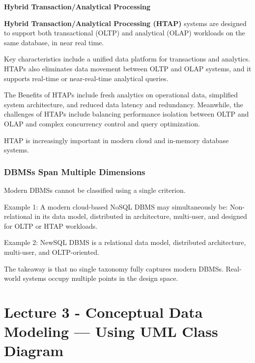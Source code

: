 \documentclass[11pt]{article}
\newenvironment{aside}
  {\begin{mdframed}[style=0,%
      leftline=false,rightline=false,leftmargin=2em,rightmargin=2em,%
          innerleftmargin=0pt,innerrightmargin=0pt,linewidth=0.75pt,%
      skipabove=7pt,skipbelow=7pt]\small}
  {\end{mdframed}}
\begin{document}
\vspace{11pt}
\textbf{Hybrid Transaction/Analytical Processing}
\vspace{11pt}

\textbf{Hybrid Transaction/Analytical Processing (HTAP)} systems are designed to support both transactional (OLTP) and analytical (OLAP) workloads on the same database, in near real time.

Key characteristics include a unified data platform for transactions and analytics. HTAPs also eliminates data movement between OLTP and OLAP systems, and it supports real-time or near-real-time analytical queries.

The Benefits of HTAPs include fresh analytics on operational data, simplified system architecture, and reduced data latency and redundancy. Meanwhile, the challenges of HTAPs include balancing performance isolation between OLTP and OLAP and complex concurrency control and query optimization.

\vspace{11pt}
\begin{aside}
    HTAP is increasingly important in modern cloud and in-memory database systems.
\end{aside}

\vspace{11pt}
\subsubsection{DBMSs Span Multiple Dimensions}
\vspace{11pt}

Modern DBMSs cannot be classified using a single criterion.

Example 1: A modern cloud-based NoSQL DBMS may simultaneously be: Non-relational in its data model, distributed in architecture, multi-user, and designed for OLTP or HTAP workloads.

Example 2: NewSQL DBMS is a relational data model, distributed architecture, multi-user, and OLTP-oriented.

The takeaway is that no single taxonomy fully captures modern DBMSs. Real-world systems occupy multiple points in the design space.

\vspace{11pt}
\section{Lecture 3 - Conceptual Data Modeling --- Using UML Class Diagram}
\vspace{11pt}
\end{document}

